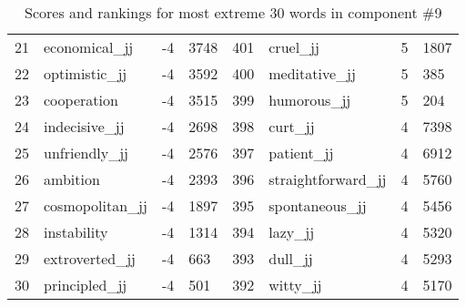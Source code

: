 \begin{table}[tbp]
\begin{tabular}{| rlr@{.}l | rlr@{.}l |}
    21 & economical\_jj & -4 & 3748    &    401 & cruel\_jj & 5 & 1807 \\
    22 & optimistic\_jj & -4 & 3592    &    400 & meditative\_jj & 5 & 385 \\
    23 & cooperation & -4 & 3515    &    399 & humorous\_jj & 5 & 204 \\
    24 & indecisive\_jj & -4 & 2698    &    398 & curt\_jj & 4 & 7398 \\
    25 & unfriendly\_jj & -4 & 2576    &    397 & patient\_jj & 4 & 6912 \\
    26 & ambition & -4 & 2393    &    396 & straightforward\_jj & 4 & 5760 \\
    27 & cosmopolitan\_jj & -4 & 1897    &    395 & spontaneous\_jj & 4 & 5456 \\
    28 & instability & -4 & 1314    &    394 & lazy\_jj & 4 & 5320 \\
    29 & extroverted\_jj & -4 & 663    &    393 & dull\_jj & 4 & 5293 \\
    30 & principled\_jj & -4 & 501    &    392 & witty\_jj & 4 & 5170 \\
    \hline
    \end{tabular}
    \caption{Scores and rankings for most extreme 30 words in component \#9} 
\end{table}
\clearpage
